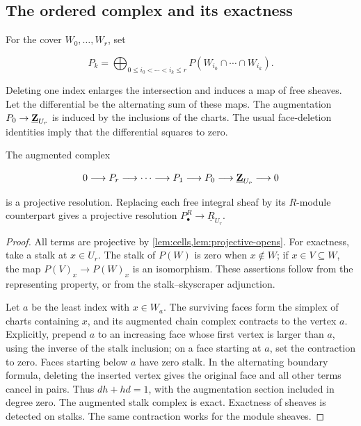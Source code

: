 \subsection{The ordered complex and its exactness}

For the cover \(W_0,\ldots,W_r\), set

\[
P_k=\bigoplus_{0\leq i_0<\cdots<i_k\leq r}
P(W_{i_0}\cap\cdots\cap W_{i_k}).
\]

Deleting one index enlarges the intersection and induces a map of free
sheaves. Let the differential be the alternating sum of these maps.
The augmentation \(P_0\to\underline{\mathbf Z}_{U_r}\) is induced by the
inclusions of the charts. The usual face-deletion identities imply
that the differential squares to zero.

\begin{proposition}\label{prop:resolution}
The augmented complex

\[
0\longrightarrow P_r\longrightarrow\cdots\longrightarrow P_1
\longrightarrow P_0\longrightarrow\underline{\mathbf Z}_{U_r}
\longrightarrow0
\]

is a projective resolution. Replacing each free integral sheaf by
its \(R\)-module counterpart gives a projective resolution
\(P_\bullet^R\to\underline R_{U_r}\).
\end{proposition}

\begin{proof}
All terms are projective by \cref{lem:cells,lem:projective-opens}.
For exactness, take a stalk at \(x\in U_r\). The stalk of \(P(W)\)
is zero when \(x\notin W\); if \(x\in V\subseteq W\), the map
\(P(V)_x\to P(W)_x\) is an isomorphism. These assertions follow
from the representing property, or from the stalk--skyscraper
adjunction.

Let \(a\) be the least index with \(x\in W_a\). The surviving
faces form the simplex of charts containing \(x\), and its
augmented chain complex contracts to the vertex \(a\). Explicitly,
prepend \(a\) to an increasing face whose first vertex is larger
than \(a\), using the inverse of the stalk inclusion; on a face
starting at \(a\), set the contraction to zero. Faces starting below
\(a\) have zero stalk. In the alternating boundary formula, deleting
the inserted vertex gives the original face and all other terms
cancel in pairs. Thus \(dh+hd=1\), with the augmentation section
included in degree zero. The augmented stalk complex is exact.
Exactness of sheaves is detected on stalks. The same contraction works
for the module sheaves.
\end{proof}

